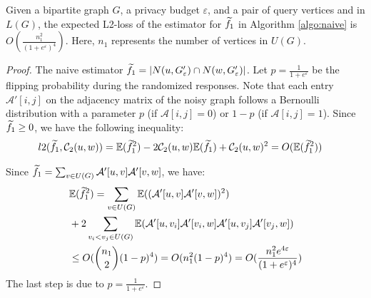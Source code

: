 \begin{theorem} 
\label{thm:f1}
{\color{black}
Given a bipartite graph $G$, a privacy budget $\varepsilon$, and a pair of query vertices \vq and \vx in $L(G)$, the expected L2-loss of the estimator for $\widetilde{f}_1$ in Algorithm \ref{algo:naive} is $O(\frac{n_1^2}{(1+e^{\varepsilon})^4 }) $. 
Here, $n_1$ represents the number of vertices in $U(G)$. 
}

\end{theorem} 
\begin{proof}
{\color{black}
    The naive estimator $\widetilde{f}_1 = |N(u, G_{\varepsilon}')  \cap N(w, G_{\varepsilon}')|$. 
    Let $p = \frac{1}{1 + e^\varepsilon}$ be the flipping probability during the randomized responses. 
    Note that each entry $\mathcal{A}'[i,j]$ on the adjacency matrix of the noisy graph follows a Bernoulli distribution with a parameter $p$ (if $\mathcal{A}[i,j]=0$) or $1-p$ (if $\mathcal{A}[i,j]=1$). 
    Since $\widetilde{f}_1\geq 0$, we have the following inequality:
        \begin{align*}
        & l2(\widetilde{f}_1, \mathcal{C}_2(u,w))  
        =  \mathbb{E}( \widetilde{f}_1^2) -2 \mathcal{C}_2(u,w)  \mathbb{E}(\widetilde{f}_1) + \mathcal{C}_2(u,w)^2
        = O(\mathbb{E}( \widetilde{f}_1^2)) 
        \end{align*}
        
Since $\widetilde{f}_1 = \sum_{v \in U(G) } \mathcal{A}'[u,v] \mathcal{A}'[v,w]$, we have: 
\begin{align*}
& \mathbb{E}( \widetilde{f}_1^2) 
= \sum_{v \in U(G)} \mathbb{E}((\mathcal{A}'[u,v] \mathcal{A}'[v,w])^2) \\
& + 2 \sum_{v_i < v_j \in U(G)} \mathbb{E}( \mathcal{A}'[u,v_i] \mathcal{A}'[v_i,w]\mathcal{A}'[u,v_j] \mathcal{A}'[v_j,w]) \\ 
& \leq O({n_1 \choose 2 } (1-p)^4    ) = O(n_1^2 (1-p)^4 )= O(\frac{ n_1^2 e^{4 \varepsilon}}{(1 + e^{\varepsilon})^4} )
\end{align*}
The last step is due to $p = \frac{1}{1 + e^{\varepsilon}}$. 
}
\end{proof}

